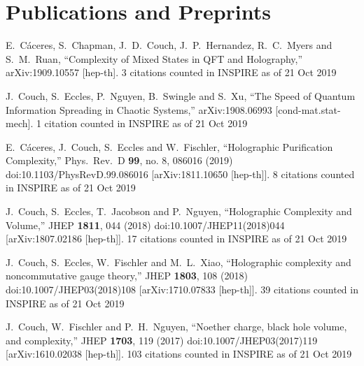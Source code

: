 \documentclass[letterpaper]{article}
\renewenvironment{itemize}{
  \begin{list}{}{
    \setlength{\leftmargin}{1.5em}
  }
}{
  \end{list}
}
\begin{document}
\section*{Publications and Preprints}
\begin{itemize}
  
\item
  E.~C\'aceres, S.~Chapman, J.~D.~Couch, J.~P.~Hernandez, R.~C.~Myers and S.~M.~Ruan,
  ``Complexity of Mixed States in QFT and Holography,''
  arXiv:1909.10557 [hep-th].
  3 citations counted in INSPIRE as of 21 Oct 2019

\item
  J.~Couch, S.~Eccles, P.~Nguyen, B.~Swingle and S.~Xu,
  ``The Speed of Quantum Information Spreading in Chaotic Systems,''
  arXiv:1908.06993 [cond-mat.stat-mech].
  1 citation counted in INSPIRE as of 21 Oct 2019

\item 
  E.~C\'aceres, J.~Couch, S.~Eccles and W.~Fischler,
  ``Holographic Purification Complexity,''
  Phys.\ Rev.\ D {\bf 99}, no. 8, 086016 (2019)
  doi:10.1103/PhysRevD.99.086016
  [arXiv:1811.10650 [hep-th]].
  8 citations counted in INSPIRE as of 21 Oct 2019

\item 
  J.~Couch, S.~Eccles, T.~Jacobson and P.~Nguyen,
  ``Holographic Complexity and Volume,''
  JHEP {\bf 1811}, 044 (2018)
  doi:10.1007/JHEP11(2018)044
  [arXiv:1807.02186 [hep-th]].
  17 citations counted in INSPIRE as of 21 Oct 2019
  
\item
  J.~Couch, S.~Eccles, W.~Fischler and M.~L.~Xiao,
  ``Holographic complexity and noncommutative gauge theory,''
  JHEP {\bf 1803}, 108 (2018)
  doi:10.1007/JHEP03(2018)108
  [arXiv:1710.07833 [hep-th]].
  39 citations counted in INSPIRE as of 21 Oct 2019

\item  
  J.~Couch, W.~Fischler and P.~H.~Nguyen,
  ``Noether charge, black hole volume, and complexity,''
  JHEP {\bf 1703}, 119 (2017)
  doi:10.1007/JHEP03(2017)119
  [arXiv:1610.02038 [hep-th]].
  103 citations counted in INSPIRE as of 21 Oct 2019

  
\end{itemize}
\end{document}
